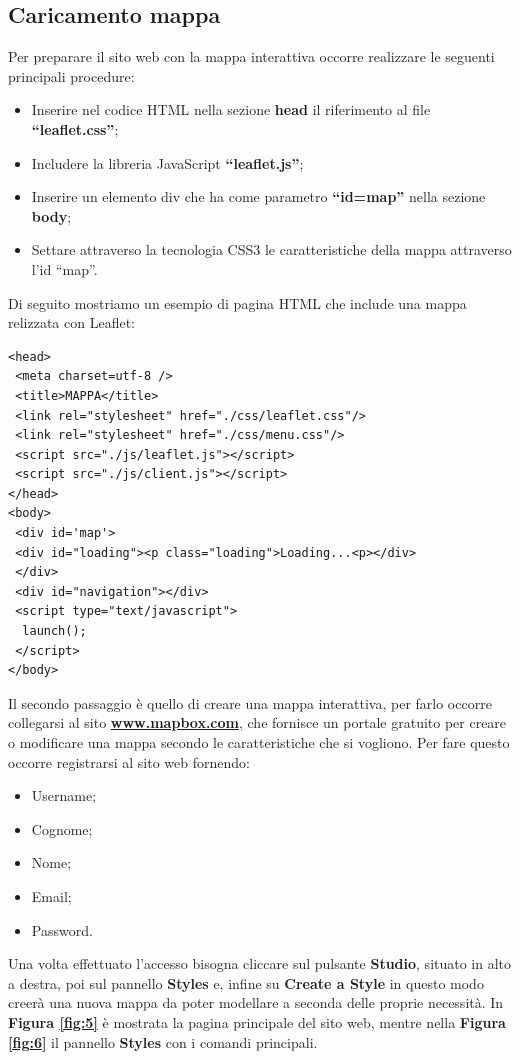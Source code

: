 \documentclass[a4paper,11pt]{article}
\begin{document}
\subsection{Caricamento mappa}
\label{sec:3.1}
Per preparare il sito web con la mappa interattiva occorre realizzare le seguenti principali procedure:
\begin{itemize}
	\item Inserire nel codice HTML nella sezione \textbf{head} il riferimento al file \textbf{"`leaflet.css"'};
	\item Includere la libreria JavaScript \textbf{"`leaflet.js"'};
	\item Inserire un elemento div che ha come parametro \textbf{"`id=map"'} nella sezione \textbf{body};
	\item Settare attraverso la tecnologia CSS3 le caratteristiche della mappa attraverso l'id "`map"'.				
\end{itemize}
Di seguito mostriamo un esempio di pagina HTML che include una mappa relizzata con Leaflet:
\begin{lstlisting}[style=htmlcssjs]
<head>
 <meta charset=utf-8 />
 <title>MAPPA</title>
 <link rel="stylesheet" href="./css/leaflet.css"/>
 <link rel="stylesheet" href="./css/menu.css"/>		
 <script src="./js/leaflet.js"></script>
 <script src="./js/client.js"></script>		
</head>
<body>		
 <div id='map'>
 <div id="loading"><p class="loading">Loading...<p></div>
 </div>					
 <div id="navigation"></div>		
 <script type="text/javascript">
  launch();
 </script>
</body>
\end{lstlisting}
Il secondo passaggio è quello di creare una mappa interattiva, per farlo occorre collegarsi al sito \textbf{\url{www.mapbox.com}}, che fornisce un portale gratuito per creare o modificare una mappa secondo le caratteristiche che si vogliono.
Per fare questo occorre registrarsi al sito web fornendo:
\begin{itemize}
	\item Username;
	\item Cognome;
	\item Nome;
	\item Email;
	\item Password.
\end{itemize}
Una volta effettuato l'accesso bisogna cliccare sul pulsante \textbf{Studio}, situato in alto a destra, poi sul pannello \textbf{Styles} e, infine su \textbf{Create a Style} in questo modo creerà una nuova mappa da poter modellare a seconda delle proprie necessità. In \textbf{Figura \ref{fig:5}} è mostrata la pagina principale del sito web, mentre nella \textbf{Figura \ref{fig:6}} il pannello \textbf{Styles} con i comandi principali.
\end{document}
